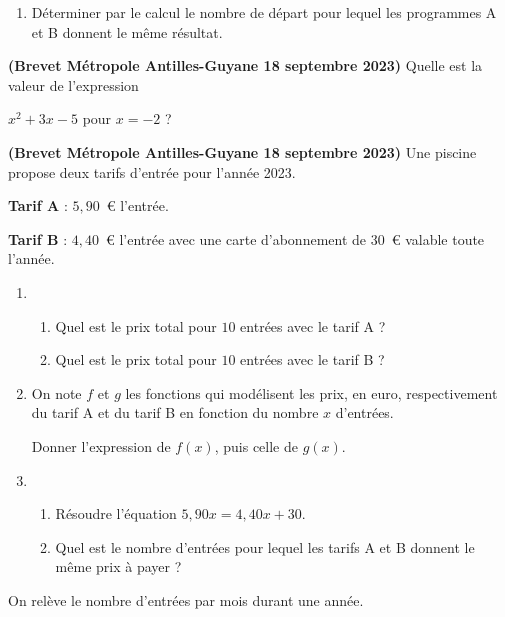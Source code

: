 \begin{act}
\medskip

\begin{enumerate}[start=4]
	\item Déterminer par le calcul le nombre de départ pour lequel les programmes A et B donnent le même résultat.
\end{enumerate}
\end{act}


\begin{act}\textbf{(Brevet Métropole Antilles-Guyane 18 septembre 2023)}
Quelle est la valeur de l’expression 

$x^2 + 3x - 5$ pour $x  =  - 2$ ?%
\end{act}

\begin{act}\textbf{(Brevet Métropole Antilles-Guyane 18 septembre 2023)}
Une piscine propose deux tarifs d'entrée pour l'année 2023.

\textbf{Tarif A} : $5,90$~\euro{} l'entrée.

\textbf{Tarif B} : $4,40$~\euro{} l'entrée avec une carte d'abonnement de $30$~\euro{} valable toute l'année.

\medskip

\begin{enumerate}
\item 
	\begin{enumerate}
		\item Quel est le prix total pour $10$ entrées avec le tarif A ? 
		\item Quel est le prix total pour $10$ entrées avec le tarif B ?
	\end{enumerate}
\item  On note $f$ et $g$ les fonctions qui modélisent les prix, en euro, respectivement du tarif A et du tarif B en fonction du nombre $x$ d'entrées.

Donner l'expression de $f(x)$, puis celle de $g(x)$.
\item 
	\begin{enumerate}
		\item Résoudre l'équation $5,90x = 4,40x + 30$.
		\item Quel est le nombre d'entrées pour lequel les tarifs A et B donnent le même prix à payer ?
	\end{enumerate}
\end{enumerate}

On relève le nombre d'entrées par mois durant une année.


\end{act}
